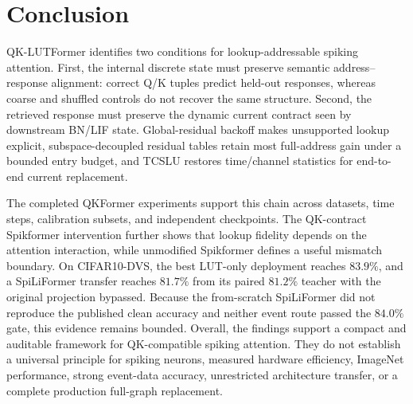 \section{Conclusion}
\label{sec:conclusion}

QK-LUTFormer identifies two conditions for lookup-addressable spiking
attention. First, the internal discrete state must preserve semantic
address--response alignment: correct Q/K tuples predict held-out responses,
whereas coarse and shuffled controls do not recover the same structure.
Second, the retrieved response must preserve the dynamic current contract seen
by downstream BN/LIF state. Global-residual backoff makes unsupported lookup
explicit, subspace-decoupled residual tables retain most full-address gain
under a bounded entry budget, and TCSLU restores time/channel statistics for
end-to-end current replacement.

The completed QKFormer experiments support this chain across datasets, time
steps, calibration subsets, and independent checkpoints. The QK-contract
Spikformer intervention further shows that lookup fidelity depends on the
attention interaction, while unmodified Spikformer defines a useful mismatch
boundary. On CIFAR10-DVS, the best LUT-only deployment reaches $83.9\%$, and
a SpiLiFormer transfer reaches $81.7\%$ from its paired $81.2\%$ teacher with
the original projection bypassed. Because the from-scratch SpiLiFormer did not
reproduce the published clean accuracy and neither event route passed the
$84.0\%$ gate, this evidence remains bounded. Overall, the findings support a
compact and auditable framework for QK-compatible spiking attention. They do
not establish a universal principle for spiking neurons, measured hardware
efficiency, ImageNet performance, strong event-data accuracy, unrestricted
architecture transfer, or a complete production full-graph replacement.
